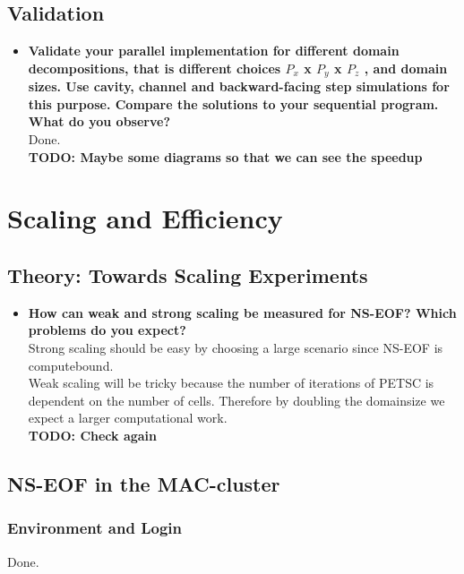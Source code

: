 \documentclass[a4paper]{article}
\newcommand{\td}[1]{
	\textbf{\color{red}TODO: {#1}}
}
\begin{document}
\subsection{Validation}
\begin{itemize}
	\item \textbf{Validate your parallel implementation for different domain decompositions, that is different choices $P_x$ x $P_y$ x $P_z$ , and domain sizes. Use cavity, channel and backward-facing step simulations for this purpose. Compare the solutions to your sequential program. What do you observe?}\\
	Done.\\
	\td{Maybe some diagrams so that we can see the speedup}
	
\end{itemize}

\section{Scaling and Efficiency}
\subsection{Theory: Towards Scaling Experiments}
\begin{itemize}
	\item \textbf{How can weak and strong scaling be measured for NS-EOF? Which problems do you expect?}\\
	Strong scaling should be easy by choosing a large scenario since NS-EOF is computebound.\\
	Weak scaling will be tricky because the number of iterations of PETSC is dependent on the number of cells. Therefore by doubling the domainsize we expect a larger computational work.\\
	\td{Check again}
\end{itemize}
\subsection{NS-EOF in the MAC-cluster}
\subsubsection{Environment and Login}
Done.
\end{document}

